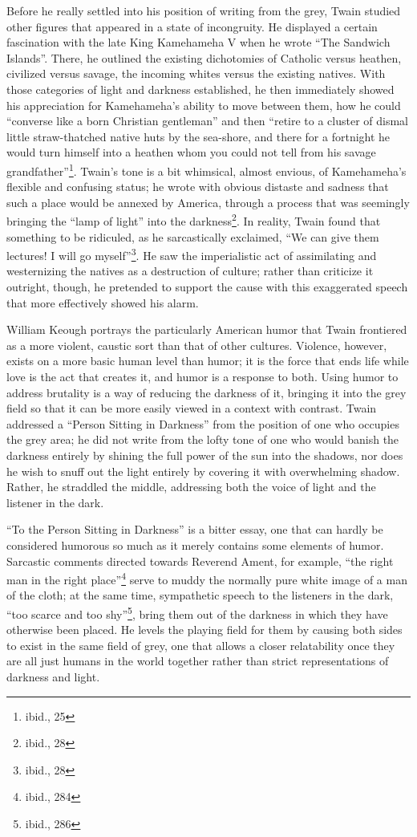 Before he really settled into his position of writing from the grey, Twain
studied other figures that appeared in a state of incongruity. He displayed a
certain fascination with the late King Kamehameha V when he wrote ``The Sandwich
Islands''. There, he outlined the existing dichotomies of Catholic versus
heathen, civilized versus savage, the incoming whites versus the existing
natives. With those categories of light and darkness established, he then
immediately showed his appreciation for Kamehameha's ability to move between
them, how he could ``converse like a born Christian gentleman'' and then
``retire to a cluster of dismal little straw-thatched native huts by the
sea-shore, and there for a fortnight he would turn himself into a heathen whom
you could not tell from his savage grandfather''\footnote{ibid., 25}. Twain's
tone is a bit whimsical, almost envious, of Kamehameha's flexible and confusing
status; he wrote with obvious distaste and sadness that such a place would be
annexed by America, through a process that was seemingly bringing the ``lamp of
light'' into the darkness\footnote{ibid., 28}. In reality, Twain found that
something to be ridiculed, as he sarcastically exclaimed, ``We can give them
lectures! I will go myself''\footnote{ibid., 28}. He saw the imperialistic act
of assimilating and westernizing the natives as a destruction of culture; rather
than criticize it outright, though, he pretended to support the cause with this
exaggerated speech that more effectively showed his alarm.

William Keough portrays the particularly American humor that Twain frontiered as
a more violent, caustic sort than that of other cultures. Violence, however,
exists on a more basic human level than humor; it is the force that ends life
while love is the act that creates it, and humor is a response to both. Using
humor to address brutality is a way of reducing the darkness of it, bringing it
into the grey field so that it can be more easily viewed in a context with
contrast. Twain addressed a ``Person Sitting in Darkness'' from the position of
one who occupies the grey area; he did not write from the lofty tone of one who
would banish the darkness entirely by shining the full power of the sun into the
shadows, nor does he wish to snuff out the light entirely by covering it with
overwhelming shadow. Rather, he straddled the middle, addressing both the voice
of light and the listener in the dark.

``To the Person Sitting in Darkness'' is a bitter essay, one that can hardly be
considered humorous so much as it merely contains some elements of humor.
Sarcastic comments directed towards Reverend Ament, for example, ``the right man
in the right place''\footnote{ibid., 284} serve to muddy the normally pure white
image of a man of the cloth; at the same time, sympathetic speech to the
listeners in the dark, ``too scarce and too shy''\footnote{ibid., 286}, bring
them out of the darkness in which they have otherwise been placed. He levels the
playing field for them by causing both sides to exist in the same field of grey,
one that allows a closer relatability once they are all just humans in the world
together rather than strict representations of darkness and light.

